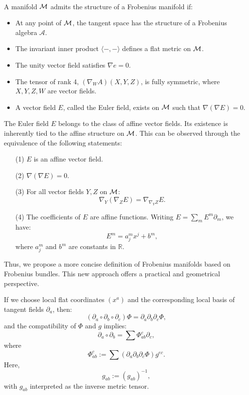 \, 

A manifold $\mathcal{M}$ admits the structure of a Frobenius manifold if:
\begin{itemize}
    \item At any point of $\mathcal{M}$, the tangent space has the structure of a Frobenius algebra $\mathcal{A}$.
    \item The invariant inner product $\langle -, - \rangle$ defines a flat metric on $\mathcal{M}$.
    \item The unity vector field satisfies $\nabla e = 0$.
    \item The tensor of rank 4, $(\nabla_W A)(X, Y, Z)$, is fully symmetric, where $X,Y,Z,W$ are vector fields.
    \item A vector field $E$, called the Euler field, exists on $\mathcal{M}$ such that $\nabla(\nabla E) = 0$.
\end{itemize}

The Euler field $E$ belongs to the class of affine vector fields. Its existence is inherently tied to the affine structure on $\mathcal{M}$. This can be observed through the equivalence of the following statements:
\begin{itemize}
    \item[(1)] $E$ is an affine vector field.
    \item[(2)] $\nabla(\nabla E) = 0$.
    \item[(3)] For all vector fields $Y, Z$ on $\mathcal{M}$:
    \[
    \nabla_Y(\nabla_Z E) = \nabla_{\nabla_Y Z} E.
    \]
    \item[(4)] The coefficients of $E$ are affine functions. Writing $E = \sum_m E^m \partial_m$, we have:
    \[
    E^m = a^m_j x^j + b^m,
    \]
    where $a^m_j$ and $b^m$ are constants in $\mathbb{R}$.
\end{itemize}

Thus, we propose a more concise definition of Frobenius manifolds based on Frobenius bundles. This new approach offers a practical and geometrical perspective.




\begin{remark}
If we choose local flat coordinates $(x^a)$ and the corresponding local basis of tangent fields $\partial_a$, then:
\[
(\partial_a \circ \partial_b \circ \partial_c) \Phi = \partial_a \partial_b \partial_c \Phi,
\]
and the compatibility of $\Phi$ and $g$ implies:
\[
\partial_a \circ \partial_b = \sum \Phi_{ab}^c \partial_c,
\]
where
\[
\Phi_{ab}^c := \sum (\partial_a \partial_b \partial_c \Phi) g^{ec}.
\]
Here,
\[
g_{ab} := (g_{ab})^{-1},
\]
with $g_{ab}$ interpreted as the inverse metric tensor.
\end{remark}

